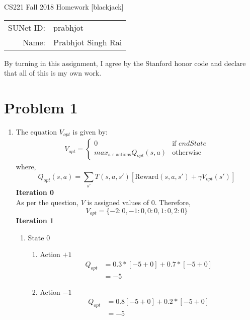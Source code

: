 \documentclass[12pt]{article}
\begin{document}
\begin{center}
{\Large CS221 Fall 2018 Homework [blackjack]}

\begin{tabular}{rl}
SUNet ID: & prabhjot \\
Name: & Prabhjot Singh Rai
\end{tabular}
\end{center}

By turning in this assignment, I agree by the Stanford honor code and declare
that all of this is my own work.

\section*{Problem 1}

\begin{enumerate}[label=(\alph*)]
  \item 
  The equation $V_{opt}$  is given by: \\
  \begin{align*}
  V_{opt} = \begin{cases} 
  0 & \text{if $endState$} \\
  max_{\text{a } \epsilon \text{ actions}} Q_{opt}(s, a) & \text{otherwise}
  \end{cases}
  \end{align*}
  where,
  $$Q_{opt}(s, a) = \sum_{s'} T(s, a, s')[\text{Reward}(s, a, s') + \gamma V_{opt}(s')]$$
  \textbf{Iteration 0} \\
  As per the question, $V$ is assigned values of $0$. Therefore,
  $$V_{opt} = \{-2: 0, -1: 0, 0: 0, 1: 0, 2: 0\}$$
 \textbf{Iteration 1}
 \begin{enumerate}
 	\item State $0$ \\
 	\begin{enumerate}
 		\item Action $+1$ \\
 		\begin{align*}
 		Q_{opt} &= 0.3 * [-5 + 0] + 0.7 * [-5 + 0] \\
 		&= -5
 		\end{align*}
 		\item Action $-1$ \\
 		\begin{align*}
 		Q_{opt} &= 0.8 [-5 + 0] + 0.2 * [-5 + 0] \\
 		&= -5
 		\end{align*}
 	\end{enumerate}

\end{enumerate}
\end{enumerate}
\end{document}
